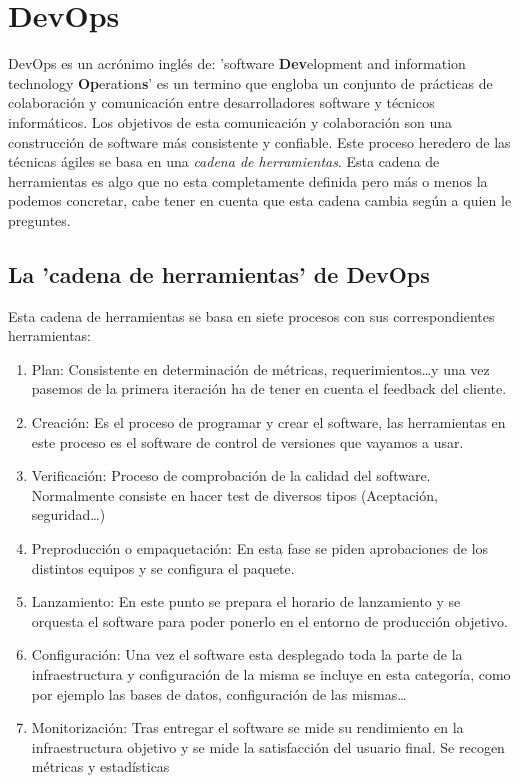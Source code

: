 \section{DevOps}

DevOps es un acrónimo inglés de: 'software \textbf{Dev}elopment and information technology \textbf{Op}eration\textbf{s}' es un termino que engloba un conjunto de prácticas de colaboración y comunicación entre desarrolladores software y técnicos informáticos. Los objetivos de esta comunicación y colaboración son una construcción de software más consistente y confiable. Este proceso heredero de las técnicas ágiles se basa en una \textit{cadena de herramientas}. Esta cadena de herramientas es algo que no esta completamente definida pero más o menos la podemos concretar, cabe tener en cuenta que esta cadena cambia según a quien le preguntes.

\subsection{La 'cadena de herramientas' de DevOps}

Esta cadena de herramientas se basa en siete procesos con sus correspondientes herramientas:

\begin{enumerate}
 \item Plan: Consistente en determinación de métricas, requerimientos\ldots y una vez pasemos de la primera iteración ha de tener en cuenta el feedback del cliente.
 \item Creación: Es el proceso de programar y crear el software, las herramientas en este proceso es el software de control de versiones que vayamos a usar.
 \item Verificación: Proceso de comprobación de la calidad del software. Normalmente consiste en hacer test de diversos tipos (Aceptación, seguridad\ldots)
 \item Preproducción o empaquetación: En esta fase se piden aprobaciones de los distintos equipos y se configura el paquete.
 \item Lanzamiento: En este punto se prepara el horario de lanzamiento y se orquesta el software para poder ponerlo en el entorno de producción objetivo.
 \item Configuración: Una vez el software esta desplegado toda la parte de la infraestructura y configuración de la misma se incluye en esta categoría, como por ejemplo las bases de datos, configuración de las mismas\ldots 
 \item Monitorización: Tras entregar el software se mide su rendimiento en la infraestructura objetivo y se mide la satisfacción del usuario final. Se recogen métricas y estadísticas
\end{enumerate}


